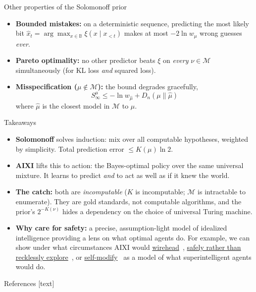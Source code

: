 \documentclass[10pt,aspectratio=169]{beamer}
\newcommand{\cM}{\mathcal{M}}
\newcommand{\B}{\mathbb{B}}
\begin{document}
\begin{frame}{Other properties of the Solomonoff prior}
\begin{itemize}
    \item \textbf{Bounded mistakes:} on a deterministic sequence, predicting the
    most likely bit $\hat{x}_t = \arg\max_{x \in \B} \xi(x \mid x_{<t})$ makes at most $-2\ln w_\mu$ wrong guesses \emph{ever}.
    \pause
    \item \textbf{Pareto optimality:} no other predictor beats $\xi$ on \emph{every} $\nu\in\cM$
    simultaneously (for KL loss \emph{and} squared loss).
    \pause
    \item \textbf{Misspecification ($\mu \notin \cM$):} the bound degrades gracefully,
    \[
    S^\mu_\infty \leq -\ln w_{\hat\mu} +  D_n(\mu \parallel \hat\mu)  
    \]
    where $\hat\mu$ is the closest model in $\cM$ to $\mu$.
\end{itemize}
\end{frame}


\begin{frame}{Takeaways}
\begin{itemize}
    \item \textbf{Solomonoff} solves induction: mix over all computable hypotheses, weighted by simplicity.
    Total prediction error $\leq K(\mu)\ln 2$.
    \pause
    \item \textbf{AIXI} lifts this to action: the Bayes-optimal policy over the same universal mixture.
    It learns to predict \emph{and} to act as well as if it knew the world.
    \pause
    \item \textbf{The catch:} both are \emph{incomputable} ($K$ is incomputable; $\cM$ is intractable to enumerate).
    They are gold standards, not computable algorithms, and the prior's $2^{-K(\nu)}$ hides a dependency
    on the choice of universal Turing machine.
    \pause
    \item \textbf{Why care for safety:} a precise, assumption-light model of idealized 
    intelligence providing a lens on what optimal agents do. For example, we
    can show under what circumstances AIXI would \href{https://people.idsia.ch/~ring/AGI-2011/Paper-B.pdf}{wirehead}~,
    \href{https://arxiv.org/pdf/2006.03357}{safely rather than recklessly explore}~, or
    \href{https://link.springer.com/chapter/10.1007/978-3-642-22887-2_1}{self-modify}~
    as a model of what superintelligent agents would do.
\end{itemize}
\end{frame}

\begin{frame}[allowframebreaks]{References}
\footnotesize
{}[text]


\end{frame}
\end{document}

